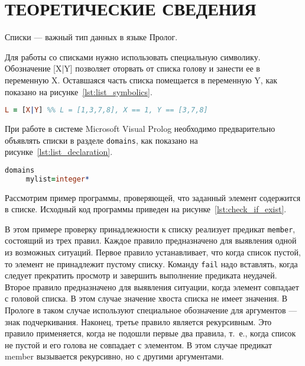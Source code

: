 \section{ТЕОРЕТИЧЕСКИЕ СВЕДЕНИЯ}

Списки --- важный тип данных в языке Пролог.

Для работы со списками нужно использовать специальную символику. 
Обозначение [X|Y] позволяет оторвать от списка голову и занести ее в переменную X.
Оставшаяся часть списка помещается в переменную Y, 
как показано на рисунке~\ref{lst:list_symbolics}.

\begin{lstlisting}[style=source_code,language=prolog,
  caption=Пример работы со списком,label=lst:list_symbolics]
 L = [X|Y] %% L = [1,3,7,8], X == 1, Y == [3,7,8]
\end{lstlisting}

При работе в системе Microsoft Visual Prolog необходимо предварительно объявлять
списки в разделе \texttt{domains}, как показано на рисунке~\ref{lst:list_declaration}.

\begin{lstlisting}[style=source_code,language=prolog,
  caption=Пример декларации списка в среде Microsoft Visual Prolog,label=lst:list_declaration]
 domains
     mylist=integer*
\end{lstlisting}

Рассмотрим пример программы, проверяющей, что заданный элемент содержится в списке. 
Исходный код программы приведен на рисунке~\ref{lst:check_if_exist}.

В этом примере проверку принадлежности к списку реализует предикат \texttt{member},
состоящий из трех правил.
Каждое правило предназначено для выявления одной из возможных ситуаций. 
Первое правило устанавливает, что когда список пустой, 
то элемент не принадлежит пустому списку. 
Команду \texttt{fail} надо вставлять, когда следует
прекратить просмотр и завершить выполнение предиката неудачей.
Второе правило предназначено для выявления ситуации, 
когда элемент совпадает с головой списка.
В этом случае значение хвоста списка не имеет значения.
В Прологе в таком случае используют специальное обозначение для аргументов --- знак подчеркивания.
Наконец, третье правило является рекурсивным. 
Это правило применяется, когда не подошли первые два правила, т.~е.,
когда список не пустой и его голова не совпадает с элементом.
В этом случае предикат member вызывается рекурсивно, но с другими аргументами.

